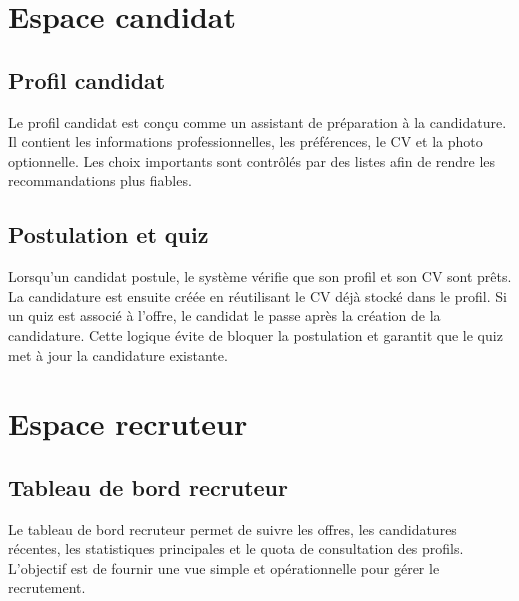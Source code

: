 
\section{Espace candidat}

\subsection{Profil candidat}

\noindent
Le profil candidat est conçu comme un assistant de préparation à la candidature. Il contient les informations professionnelles, les préférences, le CV et la photo optionnelle. Les choix importants sont contrôlés par des listes afin de rendre les recommandations plus fiables.


\subsection{Postulation et quiz}

\noindent
Lorsqu'un candidat postule, le système vérifie que son profil et son CV sont prêts. La candidature est ensuite créée en réutilisant le CV déjà stocké dans le profil. Si un quiz est associé à l'offre, le candidat le passe après la création de la candidature. Cette logique évite de bloquer la postulation et garantit que le quiz met à jour la candidature existante.


\section{Espace recruteur}

\subsection{Tableau de bord recruteur}

\noindent
Le tableau de bord recruteur permet de suivre les offres, les candidatures récentes, les statistiques principales et le quota de consultation des profils. L'objectif est de fournir une vue simple et opérationnelle pour gérer le recrutement.


